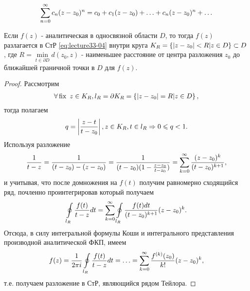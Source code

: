 
\begin{col-answer-preambule}
\end{col-answer-preambule}

\begin{equation}
  \label{eq:lecture33-04}
  \sum\limits_{n = 0}^{\infty}c_n(z - z_0)^n = c_0 + c_1(z - z_0) + \ldots + c_n(z - z_0)^n + \ldots
\end{equation}

\begin{theorem}
  Если $f(z)$ - аналитическая в односвязной области $D$, то тогда $f(z)$ разлагается в СтР
  \eqref{eq:lecture33-04} внутри круга $K_R = \left\{ \left\lvert z - z_0 \right\rvert < R \vert z \in D \right\} \subset D$,
  где $R = \min\limits_{t \in \partial D}d(z_0, z)$ - наименьшее расстояние от центра разложения
  $z_0$ до ближайшей граничной точки в $D$ для $f(z)$.
\end{theorem}
\begin{proof}
  Рассмотрим
  \begin{align*}
    \forall \operatorname{\text{fix }} z \in K_R, l_R = \partial K_R = \left\{ \left\lvert z - z_0 \right\rvert = R \vert z \in D \right\},
  \end{align*}
  тогда полагаем
  \begin{align*}
    q = \left\lvert \dfrac{z - t}{t - z_0} \right\rvert, z \in K_R, t \in l_R \Rightarrow 0 \leqslant q < 1.
  \end{align*}
  Используя разложение
  \begin{align*}
    \dfrac{1}{t - z} = \dfrac{1}{(t - z_0) - (z - z_0)} = \dfrac{1}{(t - z_0)(1 - \frac{z - z_0}{t -
        z_0})} = \sum\limits_{k = 0}^{\infty}\dfrac{(z - z_0)^k}{(t - z_0)^{k + 1}},
  \end{align*}
  и учитывая, что после домножения на $f(t)$ получим равномерно сходящийся ряд, почленно
  проинтегрировав который получаем
  \begin{align*}
    \oint\limits_{l_R}\dfrac{f(t)}{t - z}dt = \sum\limits_{k = 0}^{\infty}\oint\limits_{l_R}
    \dfrac{f(t)dt}{(t - z_0)^{k + 1}}(z - z_0)^k.
  \end{align*}
  Отсюда, в силу интегральной формулы Коши и интегрального представления производной аналитической
  ФКП, имеем
  \begin{align*}
    f(z) = \dfrac{1}{2\pi i}\oint\limits_{l_R}\dfrac{f(t)}{t - z}dt = \ldots =
    \sum\limits_{k = 0}^{\infty}\dfrac{f^{(k)}(z_0)}{k!}(z - z_0)^k,
  \end{align*}
  т.е. получаем разложение в СтР, являющийся рядом Тейлора.
\end{proof}
